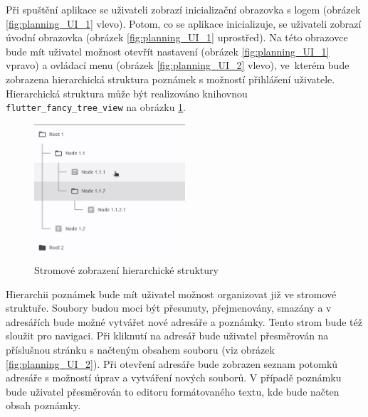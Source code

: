 \documentclass[czech, bc, kiv, he, iso690numb]{fasthesis}
\begin{document}
Při spuštění aplikace se uživateli zobrazí inicializační obrazovka s logem (obrázek \ref{fig:planning_UI_1} vlevo). Potom, co se aplikace inicializuje, se uživateli zobrazí úvodní obrazovka (obrázek \ref{fig:planning_UI_1} uprostřed). Na této obrazovce bude mít uživatel možnost otevřít nastavení (obrázek \ref{fig:planning_UI_1} vpravo) a ovládací menu (obrázek \ref{fig:planning_UI_2} vlevo), ve~kterém bude zobrazena hierarchická struktura poznámek s možností přihlášení uživatele. Hierarchická struktura může být realizováno knihovnou \texttt{flutter\_fancy\_tree\_view} na obrázku \ref{fig:treeView}.

\begin{figure}[h]
  \centering
  \includegraphics[width=0.5\textwidth]{img/BP-Runt/Planning/UI/treeView.png}
  \caption{Stromové zobrazení hierarchické struktury \cite{flutter-tree-view}}
  \label{fig:treeView}
\end{figure}

Hierarchii poznámek bude mít uživatel možnost organizovat již ve stromové struktuře. Soubory budou moci být přesunuty, přejmenovány, smazány a v adresářích bude možné vytvářet nové adresáře a poznámky. Tento strom bude též sloužit pro navigaci. Při kliknutí na adresář bude uživatel přesměrován na příslušnou stránku s načteným obsahem souboru (viz obrázek \ref{fig:planning_UI_2}). Při otevření adresáře bude zobrazen seznam potomků adresáře s možností úprav a vytváření nových souborů. V případě poznámku bude uživatel přesměrován to editoru formátovaného textu, kde bude načten obsah poznámky.  
\end{document}
